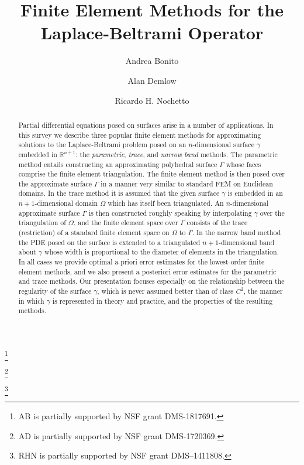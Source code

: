 \documentclass{amsart}
\begin{document}
\title[The Laplace-Beltrami Operator]{Finite Element Methods for the \\ Laplace-Beltrami Operator}%
\author{Andrea Bonito}
\address{Department of Mathematics, Texas A\&M University, College Station, TX 77843, USA; bonito@math.tamu.edu}%
\thanks{AB is partially supported by NSF grant DMS-1817691.}
\author{Alan Demlow}%
\address{Department of Mathematics, Texas A\&M University, College Station, TX 77843, USA; demlow@math.tamu.edu}%
\thanks{AD is partially supported by NSF grant DMS-1720369.}
\author{Ricardo H. Nochetto}%
\address {University of Maryland, College Park, MD 20742, USA; rhn@math.umd.edu}%
\thanks{RHN is partially supported by NSF grant DMS--1411808.}



\begin{abstract}
Partial differential equations posed on surfaces arise in a number of applications.  In this survey we describe three popular finite element methods for approximating solutions to the Laplace-Beltrami problem posed on an $n$-dimensional surface $\gamma$ embedded in $\mathbb{R}^{n+1}$:  the {\it parametric}, {\it trace}, and {\it narrow band} methods.  The parametric method entails constructing an approximating polyhedral surface $\Gamma$ whose faces comprise the finite element triangulation.  The finite element method is then posed over the approximate surface $\Gamma$ in a manner very similar to standard FEM on Euclidean domains.  In the trace method it is assumed that the given surface $\gamma$ is embedded in an $n+1$-dimensional domain $\Omega$ which has itself been triangulated.    An $n$-dimensional approximate surface $\Gamma$ is then constructed roughly speaking by interpolating $\gamma$ over the triangulation of $\Omega$, and the finite element space over $\Gamma$ consists of the trace (restriction) of a standard finite element space on $\Omega$ to $\Gamma$.  In the narrow band method the PDE posed on the surface is extended to a triangulated $n+1$-dimensional band about $\gamma$ whose width is proportional to the diameter of elements in the triangulation.  In all cases we provide optimal a priori error estimates for the lowest-order finite element methods, and we also present a posteriori error estimates for the parametric and trace methods.  Our presentation focuses especially on the relationship between the regularity of the surface $\gamma$, which is never assumed better than of class $C^2$, the manner in which $\gamma$ is represented in theory and practice, and the properties of the resulting methods.  
\end{abstract}
\end{document}
